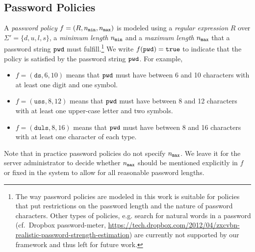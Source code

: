 \subsection{Password Policies}\label{sec:policies}
A \emph{password policy} $f=(R,{n_\mathtt{min}},{n_\mathtt{max}})$ is modeled using a \emph{regular expression} $R$ over $\Sigma'=\{d, u, l, s\}$, a \emph{minimum length} ${n_\mathtt{min}}$ and a \emph{maximum length} ${n_\mathtt{max}}$ that a password string $\mathtt{pwd}$ must fulfill.\footnote{The way password policies are modeled in this work is suitable for policies that put restrictions on the password length and the nature of password characters. Other types of policies, e.g. search for natural words in a password (cf.~Dropbox password-meter, \url{https://tech.dropbox.com/2012/04/zxcvbn-realistic-password-strength-estimation}) are currently not supported by our framework and thus left for future work.} We write $f(\mathtt{pwd})=\mathtt{true}$ to indicate that the policy is satisfied by the password string $\mathtt{pwd}$.
For example, %
\begin{itemize}
	\item $f=(\mathtt{ds}, 6, 10)$ means that $\mathtt{pwd}$ must have between 6 and 10 characters with at least one digit and one symbol.
	\item $f=(\mathtt{uss}, 8, 12)$ means that $\mathtt{pwd}$ must have between 8 and 12 characters with at least one upper-case letter and two symbols.
	\item $f=(\mathtt{duls}, 8, 16)$ means that $\mathtt{pwd}$ must have between 8 and 16 characters with at least one character of each type.
\end{itemize}
\begin{remark}Note that in practice password policies do not specify ${n_\mathtt{max}}$. We leave it for the server administrator to decide whether ${n_\mathtt{max}}$ should be mentioned explicitly in $f$ or fixed in the system to allow for all reasonable password lengths.\end{remark}

